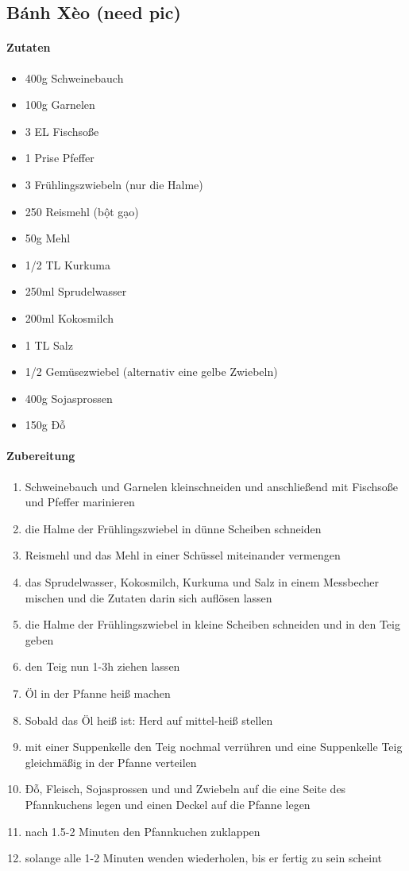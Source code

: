 \newpage
{}
\subsection{Bánh Xèo (need pic)}
\paragraph{Zutaten}
\begin{itemize}[noitemsep]
	\item 400g Schweinebauch
	\item 100g Garnelen
	\item 3 EL Fischsoße
	\item 1 Prise Pfeffer
	\item 3 Frühlingszwiebeln (nur die Halme)
	\item 250 Reismehl (bột gạo)
	\item 50g Mehl
	\item 1/2 TL Kurkuma
	\item 250ml Sprudelwasser
	\item 200ml Kokosmilch
	\item 1 TL Salz
	\item 1/2 Gemüsezwiebel (alternativ eine gelbe Zwiebeln)
	\item 400g Sojasprossen
	\item 150g Đỗ
\end{itemize}
\paragraph{Zubereitung}
\begin{enumerate}[noitemsep]
	\item Schweinebauch und Garnelen kleinschneiden und anschließend mit Fischsoße und Pfeffer marinieren
	\item die Halme der Frühlingszwiebel in dünne Scheiben schneiden
	\item Reismehl und das Mehl in einer Schüssel miteinander vermengen
	\item das Sprudelwasser, Kokosmilch, Kurkuma und Salz in einem Messbecher mischen und die Zutaten darin sich auflösen lassen
	\item die Halme der Frühlingszwiebel in kleine Scheiben schneiden und in den Teig geben
	\item den Teig nun 1-3h ziehen lassen
	\vspace{0.5cm}
	\item Öl in der Pfanne heiß machen
	\item Sobald das Öl heiß ist: Herd auf mittel-heiß stellen
	\item mit einer Suppenkelle den Teig nochmal verrühren und eine Suppenkelle Teig gleichmäßig in der Pfanne verteilen
	\item Đỗ, Fleisch, Sojasprossen und und Zwiebeln auf die eine Seite des Pfannkuchens legen und einen Deckel auf die Pfanne legen
	\item nach 1.5-2 Minuten den Pfannkuchen zuklappen 
	\item solange alle 1-2 Minuten wenden wiederholen, bis er fertig zu sein scheint
\end{enumerate}